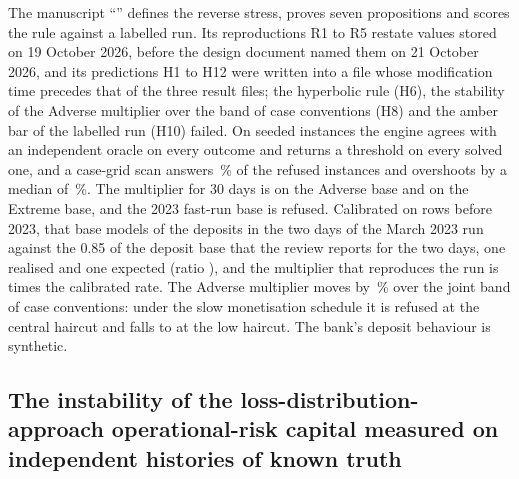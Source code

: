 The manuscript ``\pxPaperTitleEleven{}'' defines the reverse stress, proves seven propositions and scores the rule against a labelled run. Its reproductions R1 to R5 restate values stored on 19 October 2026,
before the design document named them on 21 October 2026, and its predictions H1 to H12 were written into a file whose modification time precedes that of the three result files; the hyperbolic rule (H6), the stability of the
Adverse multiplier over the band of case conventions (H8) and the amber bar of the labelled run (H10) failed. On \pxPpElevenInst{} seeded instances the engine agrees with an independent oracle on every outcome and returns a
threshold on every solved one, and a case-grid scan answers \pxPpElevenScanFalse{}\,\% of the refused instances and overshoots by a median of \pxPpElevenScanErr{}\,\%. The multiplier for 30 days is \pxPpElevenAdv{} on the
Adverse base and \pxPpElevenExt{} on the Extreme base, and the 2023 fast-run base is refused. Calibrated on rows before 2023, that base models \pxPpElevenSvbModel{} of the deposits in the two days of the March 2023 run
against the 0.85 of the deposit base that the review reports for the two days, one realised and one expected (ratio \pxPpElevenSvbRatio{}), and the multiplier that reproduces the run is \pxPpElevenSvbMult{} times the calibrated rate. The Adverse multiplier moves by \pxPpElevenJointDev{}\,\% over the joint band of
case conventions: under the slow monetisation schedule it is refused at the central haircut and falls to \pxPpElevenLowSlow{} at the low haircut. The bank's deposit behaviour is synthetic.

\subsection{The instability of the loss-distribution-approach operational-risk capital measured on independent histories of known truth}
\label{sec:bs12}

